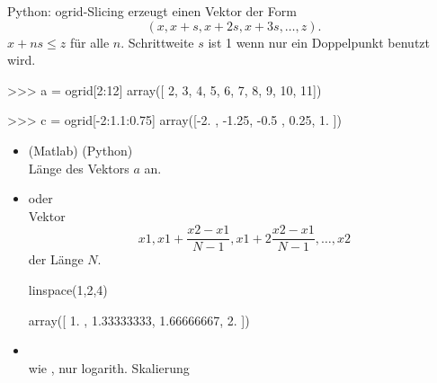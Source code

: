 \documentclass[hyperref={xetex}]{beamer}
\begin{document}
\begin{frame}[fragile]{Python: ogrid-Slicing}
 erzeugt einen Vektor der Form 
\[ (x,x+s,x+2s,x+3s, \ldots , z). \]
$x + ns \le z$ für alle $n$.
Schrittweite $s$ ist 1 wenn nur ein Doppelpunkt benutzt wird.
\begin{pyin}
>>> a = ogrid[2:12]
array([ 2,  3,  4,  5,  6,  7,  8,  9, 10, 11])

>>> c = ogrid[-2:1.1:0.75]
array([-2.  , -1.25, -0.5 ,  0.25,  1.  ])

\end{pyin}
\end{frame} 

%
%
\begin{frame}[fragile]{}
\begin{itemize}
\item {}(Matlab) (Python)\\ Länge des Vektors $a$ an.
\item {} oder \\ Vektor
\[ x1, x1+\frac{x2-x1}{N-1}, x1+2 \frac{x2-x1}{N-1}, \dots ,x2  \]
der Länge $N$.
\begin{pyin}
linspace(1,2,4)
\end{pyin}
\begin{pyout}
array([ 1.  ,  1.33333333,  1.66666667,  2. ])
\end{pyout}

\item {}\\ wie , nur logarith. Skalierung
\end{itemize}
\end{frame}
\end{document}
